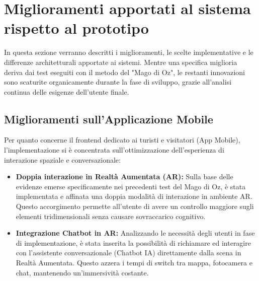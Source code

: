 \section{Miglioramenti apportati al sistema rispetto al prototipo}

In questa sezione verranno descritti i miglioramenti, le scelte implementative e le differenze architetturali apportate ai sistemi. Mentre una specifica miglioria deriva dai test eseguiti con il metodo del "Mago di Oz", le restanti innovazioni sono scaturite organicamente durante la fase di sviluppo, grazie all'analisi continua delle esigenze dell'utente finale.

\subsection{Miglioramenti sull'Applicazione Mobile}
Per quanto concerne il frontend dedicato ai turisti e visitatori (App Mobile), l'implementazione si è concentrata sull'ottimizzazione dell'esperienza di interazione spaziale e conversazionale:
\begin{itemize}
    \item \textbf{Doppia interazione in Realtà Aumentata (AR):} Sulla base delle evidenze emerse specificamente nei precedenti test del Mago di Oz, è stata implementata e affinata una doppia modalità di interazione in ambiente AR. Questo accorgimento permette all'utente di avere un controllo maggiore sugli elementi tridimensionali senza causare sovraccarico cognitivo.
    \item \textbf{Integrazione Chatbot in AR:} Analizzando le necessità degli utenti in fase di implementazione, è stata inserita la possibilità di richiamare ed interagire con l'assistente conversazionale (Chatbot IA) direttamente dalla scena in Realtà Aumentata. Questo azzera i tempi di switch tra mappa, fotocamera e chat, mantenendo un'immersività costante.
\end{itemize}

